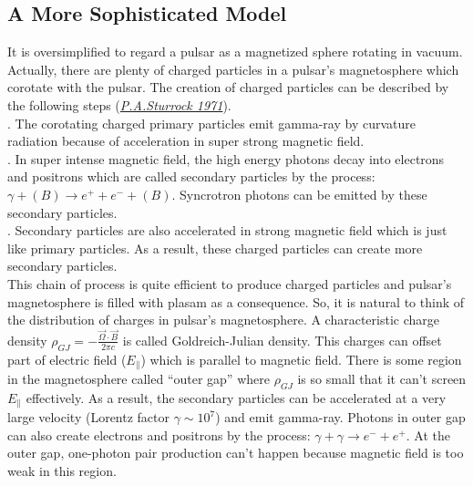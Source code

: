 \documentclass[12pt]{report}
\begin{document}
          
        \subsection{A More Sophisticated Model}
              It is oversimplified to regard a pulsar as a magnetized sphere rotating in vacuum. Actually,
              there are plenty of 
              charged particles in a pulsar's magnetosphere which corotate with the pulsar. The creation of 
              charged particles can 
              be described by the following steps 
              (\href{http://articles.adsabs.harvard.edu/cgi-bin/nph-iarticle\_query?1971...164..529S&amp;data
              \_type=PDF\_HIGH&amp;whole\_paper=YES&amp;type=PRINTER&amp;filetype=.pdf}{\textit{P.A.Sturrock
              1971}}). \\ 
              . The corotating charged primary particles emit gamma-ray by curvature radiation 
              because of acceleration in super strong magnetic field.  \\
              . In super intense magnetic field,  the high energy photons decay into electrons and 
              positrons which are called secondary particles by the process: 
              $\gamma + (B) \rightarrow e^++e^-+(B)$. Syncrotron 
                                  photons can be emitted by these secondary particles. \\
              . Secondary particles are also accelerated in strong magnetic field which is just like 
              primary particles. As a result, these charged particles can create more secondary particles. \\
              \indent This chain of process is quite efficient to produce charged particles and pulsar's 
              magnetosphere is filled with plasam as a consequence. So, it is natural to think of the 
              distribution of charges in pulsar's magnetosphere. A characteristic charge density 
              $\rho_{GJ}=-\frac{\vec{\Omega}\cdot \vec{B}}{2\pi c}$ is called Goldreich-Julian density. 
              This charges can offset part of electric field ($E_{\parallel}$) which is parallel to magnetic 
              field. There is some region in the magnetosphere called ``outer gap'' where $\rho_{GJ}$ is so 
              small that it can't screen $E_{\parallel}$ effectively. As a result, the secondary particles can 
              be accelerated at a very large velocity (Lorentz factor $\gamma\sim 10^7$) and emit gamma-ray. 
              Photons in outer gap can also create electrons and positrons by the process: 
              $\gamma+\gamma\rightarrow e^-+e^+$. At the outer gap, one-photon pair production can't happen 
              because magnetic field is too weak in this region.
            
\end{document}
